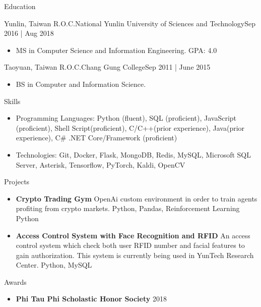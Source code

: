 \documentclass[]{mcdowellcv}
\begin{document}
\begin{cvsection}{Education}
	\begin{cvsubsection}{Yunlin, Taiwan R.O.C.}{National Yunlin University of Sciences and Technology}{Sep 2016 | Aug 2018}
		\begin{itemize}
			\item MS in Computer Science and Information Engineering. GPA: 4.0
		\end{itemize}
	\end{cvsubsection}
	\begin{cvsubsection}{Taoyuan, Taiwan R.O.C.}{Chang Gung College}{Sep 2011 | June 2015}
		\begin{itemize}
			\item BS in Computer and Information Science.
		\end{itemize}
	\end{cvsubsection}
\end{cvsection}
\begin{cvsection}{Skills}
	\begin{cvsubsection}{}{}{}
		\begin{itemize}
			\item Programming Languages:  Python (fluent), SQL (proficient), JavaScript (proficient), Shell Script(proficient), C/C++(prior experience), Java(prior experience), C\# .NET Core/Framework (proficient)
			\item Technologies:  Git, Docker, Flask, MongoDB, Redis, MySQL, Microsoft SQL Server, Asterisk, Tensorflow, PyTorch, Kaldi, OpenCV
		\end{itemize}
	\end{cvsubsection}
\end{cvsection}
\begin{cvsection}{Projects}
	\begin{cvsubsection}{}{}{}
		\begin{itemize}
			\setlength\itemsep{3pt}
			\item \textbf{Crypto Trading Gym}  OpenAi custom environment in order to train agents profiting from crypto markets. Python, Pandas, Reinforcement Learning Python
			\item \textbf{Access Control System with Face Recognition and RFID}  An access control system which check both user RFID number and facial features to gain authorization. This system is currently being used in YunTech Research Center. Python, MySQL
		\end{itemize}
	\end{cvsubsection}
\end{cvsection}
\begin{cvsection}{Awards}
	\begin{cvsubsection}{}{}{}
		\begin{itemize}
			\setlength\itemsep{3pt}
			\item \textbf{Phi Tau Phi Scholastic Honor Society}  2018
		\end{itemize}
	\end{cvsubsection}
\end{cvsection}
\ 
\end{document}
